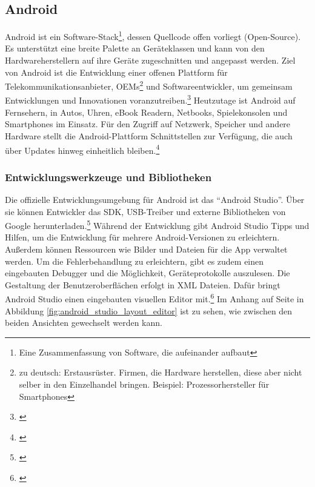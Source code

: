 \subsection{Android}
Android ist ein Software-Stack\footnote{Eine Zusammenfassung von Software, die aufeinander aufbaut}, dessen Quellcode offen vorliegt (Open-Source). Es unterstützt eine breite Palette an Geräteklassen und kann von den Hardwareherstellern auf ihre Geräte zugeschnitten und angepasst werden. Ziel von Android ist die Entwicklung einer offenen Plattform für Telekommunikationsanbieter, \glspl{OEM}\footnote{zu deutsch: Erstausrüster. Firmen, die Hardware herstellen, diese aber nicht selber in den Einzelhandel bringen. Beispiel: Prozessorhersteller für Smartphones} und Softwareentwickler, um gemeinsam Entwicklungen und Innovationen voranzutreiben.\footnote{\cite[Vgl.][]{AndroidDocSetup2020}} Heutzutage ist Android auf Fernsehern, in Autos, Uhren, eBook Readern, Netbooks, Spielekonsolen und Smartphones im Einsatz. Für den Zugriff auf Netzwerk, Speicher und andere Hardware stellt die Android-Plattform Schnittstellen zur Verfügung, die auch über Updates hinweg einheitlich bleiben.\footnote{\cite[Vgl.][1--4]{Hagos2020}}

\subsubsection{Entwicklungswerkzeuge und Bibliotheken}


Die offizielle Entwicklungsumgebung für Android ist das \enquote{Android Studio}. Über sie können Entwickler das \gls{SDK}, \gls{USB}-Treiber und externe Bibliotheken von Google herunterladen.\footnote{\cite[Vgl.][10--14]{Hagos2020}} Während der Entwicklung gibt Android Studio Tipps und Hilfen, um die Entwicklung für mehrere Android-Versionen zu erleichtern. Außerdem können Ressourcen wie Bilder und Dateien für die App verwaltet werden. Um die Fehlerbehandlung zu erleichtern, gibt es zudem einen eingebauten Debugger und die Möglichkeit, Geräteprotokolle auszulesen. Die Gestaltung der Benutzeroberflächen erfolgt in \gls{XML} Dateien. Dafür bringt Android Studio einen eingebauten visuellen Editor mit.\footnote{\cite[Vgl.][33--37]{Hagos2020}} Im Anhang auf Seite \pageref{fig:android_studio_layout_editor} in Abbildung \ref{fig:android_studio_layout_editor} ist zu sehen, wie zwischen den beiden Ansichten gewechselt werden kann.

